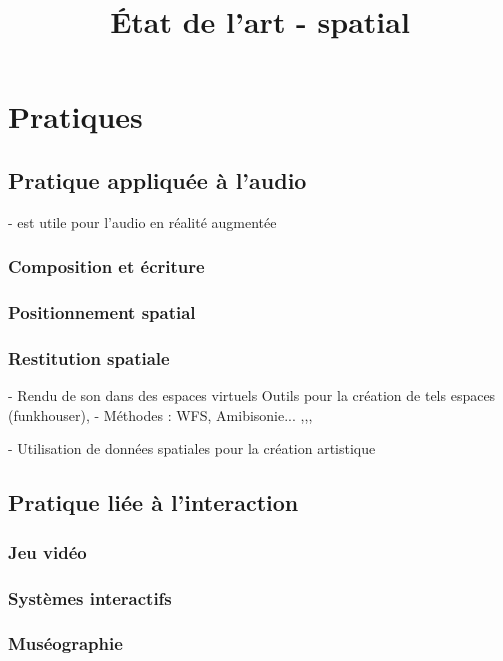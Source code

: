 \documentclass[french,12pt]{article}
\title{État de l'art - spatial}
\begin{document}
\maketitle

\section{Pratiques}
\subsection{Pratique appliquée à l'audio}
- est utile pour l'audio en réalité augmentée\cite{lemordant_augmented_2010}
\subsubsection{Composition et écriture}
\cite{colafrancesco_bibliotheque_2013}
\subsubsection{Positionnement spatial}
\subsubsection{Restitution spatiale}
- Rendu de son dans des espaces virtuels \cite{funkhouser_beam_1998,cheng_design_2014,tsingos_fast_1998,taylor_guided_2012,raghuvanshi_parametric_2014,rodriguez_performance_2014}
Outils pour la création de tels espaces (funkhouser), 
- Méthodes : WFS, Amibisonie... \cite{lim_3d_2015}
\cite{perez-lopez_3dj_2015}
\cite{noisternig_3d_2003}\cite{bates_comparative_2007},\cite{tang_assistive_2014},\cite{sasamoto_controlling_2013},\cite{delerue_spatialisation_2004}

- Utilisation de données spatiales pour la création artistique \cite{naveda_topos_2014}

\subsection{Pratique liée à l'interaction}
\subsubsection{Jeu vidéo}
\subsubsection{Systèmes interactifs}
\subsubsection{Muséographie}
\end{document}
